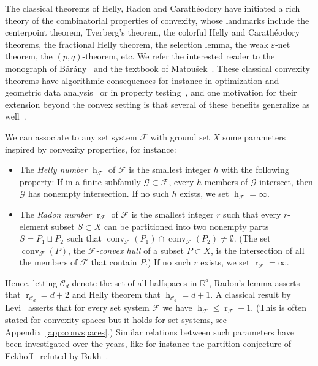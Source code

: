 \documentclass[a4paper,UKenglish,thm-restate]{article}
\newcommand{\R}{\mathbb{R}}
\newcommand{\C}{\mathcal{C}}
\newcommand{\F}{\mathcal{F}}
\newcommand{\G}{\mathcal{G}}
\DeclareMathOperator{\h}{h}
\DeclareMathOperator{\conv}{conv}
\DeclareMathOperator{\rad}{r}
\newcommand{\defn}[1]{\emph{\color{violet}#1}}
\begin{document}
The classical theorems of Helly, Radon and Carathéodory have initiated a rich theory of the combinatorial properties of convexity, whose landmarks include the centerpoint theorem, Tverberg's theorem, the colorful Helly and Carathéodory theorems, the fractional Helly theorem, the selection lemma, the weak $\varepsilon$-net theorem, the $(p,q)$-theorem, etc. We refer the interested reader to the monograph of Bárány~\cite{barany2021combinatorial} and the textbook of Matou\v{s}ek~\cite{matousek2013lectures}. These classical convexity theorems have algorithmic consequences for instance in optimization and geometric data analysis~\cite[$\mathsection~6-7$]{de2019discrete} or in property testing~\cite{chakraborty2018helly}, and one motivation for their extension beyond the convex setting is that several of these benefits generalize as well~\cite{msw-sblp-92,epstein_et_al:LIPIcs.ICALP.2020.98}.

\medskip

We can associate to any set system $\F$ with ground set $X$ some parameters inspired by convexity properties, for instance:

\begin{itemize}
\item The \defn{Helly number} $\h_\F$ of $\F$ is the smallest integer $h$ with the following property: If in a finite subfamily $\G \subset\F$, every $h$ members of $\G$ intersect, then $\G$ has nonempty intersection. If no such $h$ exists, we set $\h_\F=\infty$.\medskip

\item The \defn{Radon number} $\rad_\F$ of $\F$ is the smallest integer $r$ such that every $r$-element subset $S\subset X$ can be partitioned into two nonempty parts $S=P_1\sqcup P_2$ such that $\conv_{\F}(P_1) \cap \conv_{\F}(P_2) \neq \emptyset$. (The set $\conv_{\F}(P)$, the \emph{$\F$-convex hull} of a subset $P\subset X$, is the intersection of all the members of $\F$ that contain $P$.) If no such $r$ exists, we set $\rad_\F=\infty$.
\end{itemize}

\noindent
Hence, letting $\C_d$ denote the set of all halfspaces in $\R^d$, Radon's lemma asserts that $\rad_{\C_d} = d+2$ and Helly theorem that $\h_{\C_d} = d+1$. A classical result by Levi~\cite{Levi_radon_implies_helly} asserts that for every set system $\F$ we have $\h_{\F} \leq \rad_\F-1$. (This is often stated for convexity spaces but it holds for set systems, see Appendix~\ref{app:convspaces}.) Similar relations between such parameters have been investigated over the years, like for instance the partition conjecture of Eckhoff~\cite{ECKHOFF200061} refuted by Bukh~\cite{bukh2010radon}.
\end{document}
